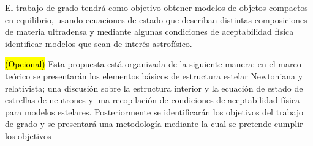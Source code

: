 El trabajo de grado tendrá como objetivo obtener modelos de objetos compactos en equilibrio, usando ecuaciones de estado que describan distintas  composiciones de materia ultradensa y mediante algunas condiciones de aceptabilidad física identificar modelos que sean de interés astrofísico.

\hl{(Opcional)} Esta propuesta está organizada de la siguiente manera: en el marco teórico se presentarán los elementos básicos de estructura estelar Newtoniana y relativista; una discusión sobre la estructura interior y la ecuación de estado de estrellas de neutrones y una recopilación de condiciones de aceptabilidad física para modelos estelares. Posteriormente se identificarán los objetivos del trabajo de grado y se presentará una metodología mediante la cual se pretende cumplir los objetivos

